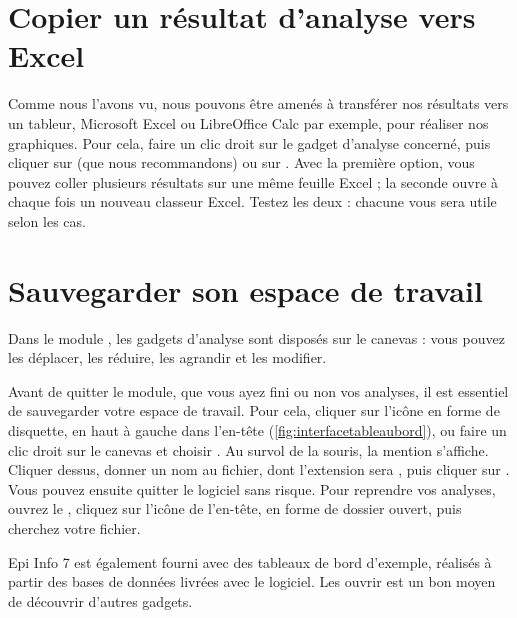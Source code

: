 \section{Copier un résultat d'analyse vers Excel}

Comme nous l'avons vu, nous pouvons être amenés à transférer nos résultats vers un tableur, Microsoft Excel ou LibreOffice Calc par exemple, pour réaliser nos graphiques.
Pour cela, faire un clic droit sur le gadget d'analyse concerné, puis cliquer sur  (que nous recommandons) ou sur . Avec la première option, vous pouvez coller plusieurs résultats sur une même feuille Excel ; la seconde ouvre à chaque fois un nouveau classeur Excel. Testez les deux : chacune vous sera utile selon les cas.

\section{Sauvegarder son espace de travail}
\label{sauvegarderTableauDeBord}

Dans le module , les gadgets d'analyse sont disposés sur le canevas : vous pouvez les déplacer, les réduire, les agrandir et les modifier.

Avant de quitter le module, que vous ayez fini ou non vos analyses, il est essentiel de sauvegarder votre espace de travail.
Pour cela, cliquer sur l'icône en forme de disquette, en haut à gauche dans l'en-tête (\autoref{fig:interfacetableaubord}), ou faire un clic droit sur le canevas et choisir . Au survol de la souris, la mention  s'affiche. Cliquer dessus, donner un nom au fichier, dont l'extension sera , puis cliquer sur . Vous pouvez ensuite quitter le logiciel sans risque. Pour reprendre vos analyses, ouvrez le , cliquez sur l'icône  de l'en-tête, en forme de dossier ouvert, puis cherchez votre fichier.

Epi Info 7 est également fourni avec des tableaux de bord d'exemple, réalisés à partir des bases de données livrées avec le logiciel. Les ouvrir est un bon moyen de découvrir d'autres gadgets.
